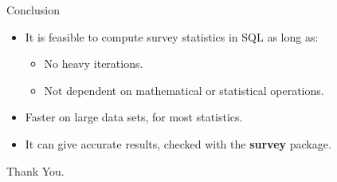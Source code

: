 \documentclass{beamer}
\begin{document}


\begin{frame}{Conclusion}
  \begin{itemize}
  \item {
    It is feasible to compute survey statistics in {\sf SQL} as long as:
      \begin{itemize}
          \item {
            No heavy iterations.
          }
          \item {
            Not dependent on mathematical or statistical operations.
          }
      \end{itemize}
  }
  
  \pause
  
  \item{
    Faster on large data sets, for most statistics.
  }
  \pause
  
 \item{
    It can give accurate results, checked with the {\bf survey} package.
 }

  \end{itemize}
\end{frame}

\begin{frame}
\begin{center}
    \Huge{Thank You.}
    \nocite{*}
\end{center}
\end{frame}

{
    \begin{frame}
    \AtNextBibliography{\tiny}
        \printbibliography
    \end{frame}
}

\end{document}
